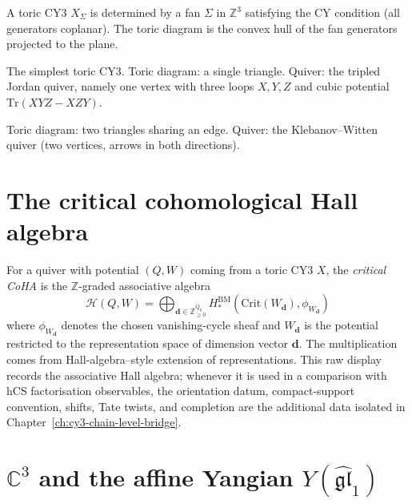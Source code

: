 A toric CY3 $X_\Sigma$ is determined by a fan $\Sigma$ in $\mathbb{Z}^3$ satisfying the CY condition (all generators coplanar). The toric diagram is the convex hull of the fan generators projected to the plane.

\begin{example}
\label{ex:c3}
The simplest toric CY3. Toric diagram: a single triangle. Quiver: the
tripled Jordan quiver, namely one vertex with three loops $X,Y,Z$ and
cubic potential $\mathrm{Tr}(XYZ-XZY)$.
\end{example}

\begin{example}
\label{ex:conifold}
Toric diagram: two triangles sharing an edge. Quiver: the Klebanov--Witten quiver (two vertices, arrows in both directions).
\end{example}

\section{The critical cohomological Hall algebra}
\label{sec:critical-coha}

\begin{definition}
\label{def:critical-coha}
For a quiver with potential $(Q, W)$ coming from a toric CY3 $X$, the \emph{critical CoHA} is the $\mathbb{Z}$-graded associative algebra
\[
 \mathcal{H}(Q, W) = \bigoplus_{\mathbf{d} \in \mathbb{Z}_{\geq 0}^{Q_0}} H^{\mathrm{BM}}_*(\mathrm{Crit}(W_\mathbf{d}), \phi_{W_\mathbf{d}})
\]
where $\phi_{W_\mathbf{d}}$ denotes the chosen vanishing-cycle sheaf and
$W_\mathbf{d}$ is the potential restricted to the representation space of
dimension vector $\mathbf{d}$. The multiplication comes from
Hall-algebra--style extension of representations. This raw display
records the associative Hall algebra; whenever it is used in a comparison
with hCS factorisation observables, the orientation datum,
compact-support convention, shifts, Tate twists, and completion are the
additional data isolated in Chapter~\ref{ch:cy3-chain-level-bridge}.
\end{definition}

\section{\texorpdfstring{$\mathbb{C}^3$}{C-3} and the affine Yangian \texorpdfstring{$Y(\widehat{\mathfrak{gl}}_1)$}{Y(widehatgl-1)}}
\label{sec:c3-yangian}

